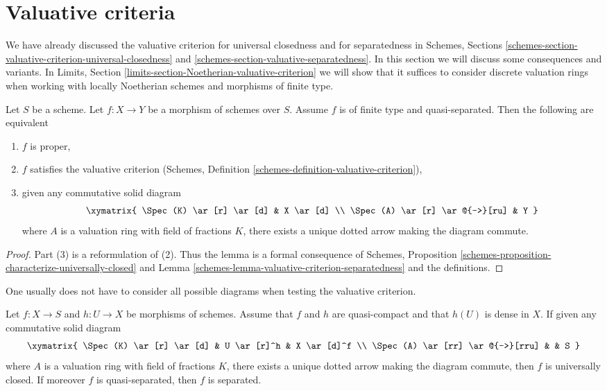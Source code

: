 \section{Valuative criteria}
\label{section-valuative-criteria}

\noindent
We have already discussed the valuative criterion for universal closedness
and for separatedness in Schemes, Sections
\ref{schemes-section-valuative-criterion-universal-closedness} and
\ref{schemes-section-valuative-separatedness}.
In this section we will discuss some consequences and variants.
In Limits, Section \ref{limits-section-Noetherian-valuative-criterion}
we will show that it suffices to consider discrete valuation
rings when working with locally Noetherian schemes and
morphisms of finite type.

\begin{lemma}
\label{lemma-characterize-proper}
\begin{reference}
\cite[II Theorem 7.3.8]{EGA}
\end{reference}
Let $S$ be a scheme. Let $f : X \to Y$ be a morphism of schemes
over $S$. Assume $f$ is of finite type and quasi-separated.
Then the following are equivalent
\begin{enumerate}
\item $f$ is proper,
\item $f$ satisfies the valuative criterion
(Schemes, Definition \ref{schemes-definition-valuative-criterion}),
\item given any commutative solid diagram
$$
\xymatrix{
\Spec(K) \ar[r] \ar[d] & X \ar[d] \\
\Spec(A) \ar[r] \ar@{-->}[ru] & Y
}
$$
where $A$ is a valuation ring with field of fractions $K$, there exists
a unique dotted arrow making the diagram commute.
\end{enumerate}
\end{lemma}

\begin{proof}
Part (3) is a reformulation of (2). Thus the lemma is a formal
consequence of
Schemes, Proposition \ref{schemes-proposition-characterize-universally-closed}
and Lemma \ref{schemes-lemma-valuative-criterion-separatedness}
and the definitions.
\end{proof}

\noindent
One usually does not have to consider all possible diagrams
when testing the valuative criterion.

\begin{lemma}
\label{lemma-refined-valuative-criterion-universally-closed}
Let $f : X \to S$ and $h : U \to X$ be morphisms of schemes.
Assume that $f$ and $h$ are quasi-compact and that $h(U)$ is dense in $X$.
If given any commutative solid diagram
$$
\xymatrix{
\Spec(K) \ar[r] \ar[d] & U \ar[r]^h & X \ar[d]^f \\
\Spec(A) \ar[rr] \ar@{-->}[rru] & & S
}
$$
where $A$ is a valuation ring with field of fractions $K$, there
exists a unique dotted arrow making the diagram commute, then $f$
is universally closed. If moreover $f$ is quasi-separated, then
$f$ is separated.
\end{lemma}

